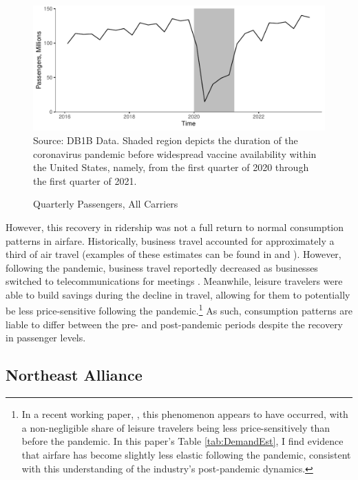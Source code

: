 \documentclass{article}
\begin{document}
\begin{figure}
	\caption{Quarterly Passengers, All Carriers}
	\label{fig:QuarterlyPass}
	\includegraphics[width = \linewidth]{Quarterly_DB1B_Itineraries}
	\footnotesize{Source: DB1B Data. Shaded region depicts the duration of the coronavirus pandemic before widespread vaccine availability within the United States, namely, from the first quarter of 2020 through the first quarter of 2021.}
\end{figure}
    
	However, this recovery in ridership was not a full return to normal consumption patterns in airfare. Historically, business travel accounted for approximately a third of air travel (examples of these estimates can be found in \citet{berry_tracing_2010} and \citet{bet_market_2021}). However, following the pandemic, business travel reportedly decreased as businesses switched to telecommunications for meetings \citep{semuels_business_2021}. Meanwhile, leisure travelers were able to build savings during the decline in travel, allowing for them to potentially be less price-sensitive following the pandemic.\footnote{In a recent working paper, \citet{ewen_zoom_2023}, this phenomenon appears to have occurred, with a non-negligible share of leisure travelers being less price-sensitively than before the pandemic. In this paper's Table \ref{tab:DemandEst}, I find evidence that airfare has become slightly less elastic following the pandemic, consistent with this understanding of the industry's post-pandemic dynamics.}  As such, consumption patterns are liable to differ between the pre- and post-pandemic periods despite the recovery in passenger levels. 
	
	\subsection{Northeast Alliance}
	\label{sec:Setting_NEA}
	
\end{document}
